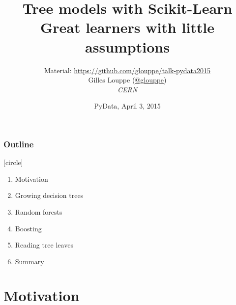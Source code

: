 \documentclass{beamer}
\title{{\bf Tree models with Scikit-Learn}\\
Great learners with little assumptions}
\author{
Material: \url{https://github.com/glouppe/talk-pydata2015}\\
\vspace{1cm}
Gilles Louppe (\href{https://twitter.com/glouppe}{@glouppe})\\
{\it CERN}
}
\date{PyData, April 3, 2015}
\begin{document}
\begin{frame}[plain]
\titlepage
\end{frame}





\begin{frame}
  \frametitle{Outline}
  [circle]
  \begin{enumerate}
  \item Motivation

  \vspace{0.5cm}

  \item Growing decision trees

  \vspace{0.5cm}

  \item Random forests

    \vspace{0.5cm}

  \item Boosting

  \vspace{0.5cm}

  \item Reading tree leaves

  \vspace{0.5cm}

  \item Summary
  \end{enumerate}
\end{frame}



\section{Motivation}
\end{document}
